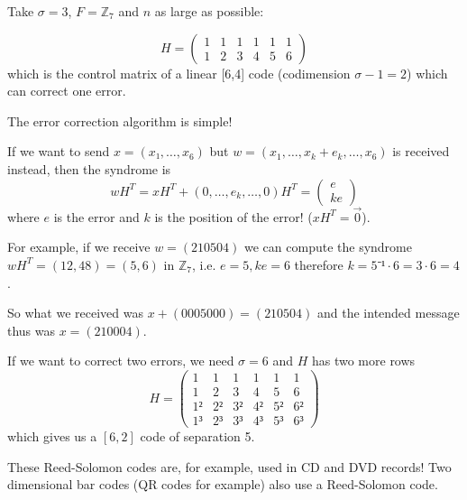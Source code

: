 \documentclass[english]{lbscript}
\begin{document}
\begin{example}{}{}
  Take \(𝜎=3\), \(F=ℤ_{7}\) and \(n\) as large as possible:

  \begin{equation}
    \label{eq:158}
    H = \begin{pmatrix}
      1 & 1 & 1 & 1 & 1 & 1 \\
      1 & 2 & 3 & 4 & 5 & 6
    \end{pmatrix}
  \end{equation}
  which is the control matrix of a linear [6,4] code (codimension \(𝜎-1=2\)) which can correct one error.

  The error correction algorithm is simple!

  If we want to send \(x=(x₁, \dots, x_6)\) but \(w=(x_1, \dots, x_k+e_k, \dots, x_6)\) is received instead, then the syndrome is
  \begin{equation}
    \label{eq:159}
    wH^{T} = xH^{T} + (0, \dots, e_k, \dots, 0)H^{T} = \begin{pmatrix}
      e \\
      ke
    \end{pmatrix}
  \end{equation}
  where \(e\) is the error and \(k\) is the position of the error! (\(xH^{T}=\vec{0}\)).

  For example, if we receive \(w=(210504)\) we can compute the syndrome \(wH^{T}= (12, 48)= (5, 6)\) in \(ℤ_{7}\), i.e. \(e=5, ke=6\) therefore \(k=5⁻¹⋅6=3⋅6=4\).

  So what we received was \(x+ (0005000) = (210504)\) and the intended message thus was \(x=(210004)\).

  If we want to correct two errors, we need \(𝜎=6\) and \(H\) has two more rows
  \begin{equation}
    \label{eq:160}
    H= \begin{pmatrix}
      1  & 1  & 1  & 1  & 1  & 1  \\
      1  & 2  & 3  & 4  & 5  & 6  \\
      1² & 2² & 3² & 4² & 5² & 6² \\
      1³ & 2³ & 3³ & 4³ & 5³ & 6³
    \end{pmatrix}
  \end{equation}
  which gives us a \([6,2]\) code of separation 5.
\end{example}
These Reed-Solomon codes are, for example, used in CD and DVD records! Two dimensional bar codes (QR codes for example) also use a Reed-Solomon code.
\end{document}
